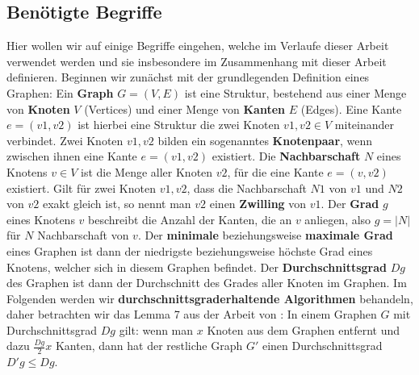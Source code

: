\documentclass[12pt,onecolumn, notitlepage]{scrartcl}
\begin{document}
\subsection{Benötigte Begriffe}
Hier wollen wir auf einige Begriffe eingehen, welche im Verlaufe dieser Arbeit verwendet werden und sie insbesondere im Zusammenhang mit dieser Arbeit definieren. Beginnen wir zunächst mit der grundlegenden Definition eines Graphen:\newline
Ein \textbf{Graph} $G = (V,E)$ ist eine Struktur, bestehend aus einer Menge von \textbf{Knoten} $V$ (Vertices) und einer Menge von \textbf{Kanten} $E$ (Edges). Eine Kante $ e = (v1,v2)$ ist hierbei eine Struktur die zwei Knoten $v1,v2 \in V$ miteinander verbindet. Zwei Knoten $v1, v2$ bilden ein sogenanntes \textbf{Knotenpaar}, wenn zwischen ihnen eine Kante $ e = (v1,v2)$ existiert. \newline
Die \textbf{Nachbarschaft} $N$ eines Knotens $v \in V$  ist die Menge aller Knoten $v2$, für die eine Kante $ e = (v,v2)$ existiert. Gilt für zwei Knoten $v1, v2$, dass die Nachbarschaft $N1$ von $v1$ und $N2$ von $v2$ exakt gleich ist, so nennt man $v2$ einen \textbf{Zwilling} von $v1$. \newline
Der \textbf{Grad} $g$ eines Knotens $v$ beschreibt die Anzahl der Kanten, die an $v$ anliegen, also $g = |N|$ für $N$ Nachbarschaft von $v$. Der \textbf{minimale} beziehungsweise \textbf{maximale Grad} eines Graphen ist dann der niedrigste beziehungsweise höchste Grad eines Knotens, welcher sich in diesem Graphen befindet.\newline
Der \textbf{Durchschnittsgrad} $Dg$ des Graphen ist dann der Durchschnitt des Grades aller Knoten im Graphen. \newline
Im Folgenden werden wir \textbf{durchschnittsgraderhaltende Algorithmen} behandeln, daher betrachten wir das Lemma 7 aus der Arbeit von \cite{BraFer}:\newline \newline
In einem Graphen $G$ mit Durchschnittsgrad $Dg$ gilt:\newline
 wenn man $x$ Knoten aus dem Graphen entfernt und dazu $\frac{Dg}{2}x$ Kanten, dann hat der restliche Graph $G'$ einen Durchschnittsgrad $D'g \leq Dg$.\newline \newline
\end{document}
